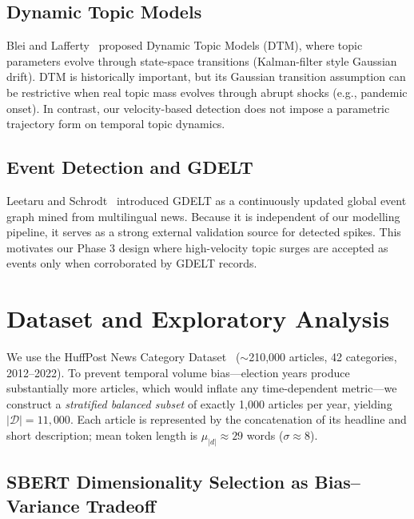 \documentclass[10pt,twocolumn,a4paper]{article}
\begin{document}
\subsection{Dynamic Topic Models}
\label{sec:related_dtm}

Blei and Lafferty~\cite{blei2006} proposed Dynamic Topic Models (DTM), where topic parameters evolve through state-space transitions (Kalman-filter style Gaussian drift). DTM is historically important, but its Gaussian transition assumption can be restrictive when real topic mass evolves through abrupt shocks (e.g., pandemic onset). In contrast, our velocity-based detection does not impose a parametric trajectory form on temporal topic dynamics.

\subsection{Event Detection and GDELT}
\label{sec:related_gdelt}

Leetaru and Schrodt~\cite{leetaru2013} introduced GDELT as a continuously updated global event graph mined from multilingual news. Because it is independent of our modelling pipeline, it serves as a strong external validation source for detected spikes. This motivates our Phase 3 design where high-velocity topic surges are accepted as events only when corroborated by GDELT records.

\section{Dataset and Exploratory Analysis}
\label{sec:data}

We use the HuffPost News Category Dataset~\cite{misra2022} ($\sim$210{,}000 articles, 42 categories, 2012--2022). To prevent temporal volume bias---election years produce substantially more articles, which would inflate any time-dependent metric---we construct a \emph{stratified balanced subset} of exactly 1{,}000 articles per year, yielding $|\mathcal{D}| = 11{,}000$. Each article is represented by the concatenation of its headline and short description; mean token length is $\mu_{|d|} \approx 29$ words ($\sigma \approx 8$).

\subsection{SBERT Dimensionality Selection as Bias--Variance Tradeoff}
\label{sec:dim_tradeoff}
\end{document}
